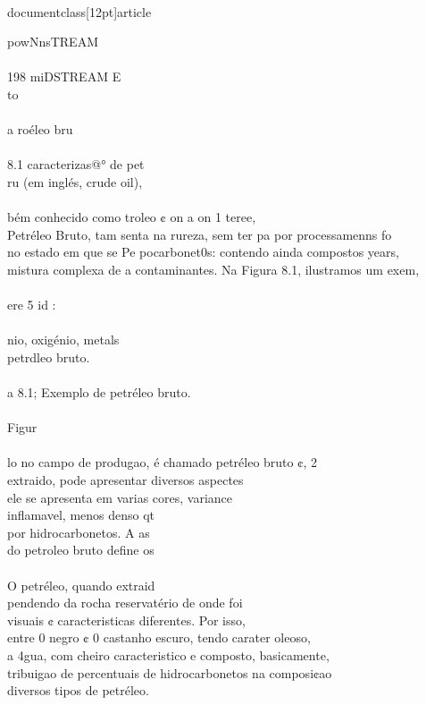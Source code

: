 \\documentclass[12pt]{article}
\begin{document}
powNnsTREAM\\
\\
198 miDSTREAM E\\
to\\
\\
a roéleo bru\\
\\
8.1 caracterizas@° de pet\\
ru (em inglés, crude oil),\\
\\
bém conhecido como troleo ¢ on a on 1 teree,\\
Petréleo Bruto, tam senta na rureza, sem ter pa por processamenns fo\\
no estado em que se Pe pocarbonet0s: contendo ainda compostos years,\\
mistura complexa de a contaminantes. Na Figura 8.1, ilustramos um exem,\\
\\
ere 5 id :\\
\\
nio, oxigénio, metals\\
petrdleo bruto.\\
\\
a 8.1; Exemplo de petréleo bruto.\\
\\
Figur\\
\\
lo no campo de produgao, é chamado petréleo bruto ¢, 2\\
extraido, pode apresentar diversos aspectes\\
ele se apresenta em varias cores, variance\\
inflamavel, menos denso qt\\
por hidrocarbonetos. A as\\
do petroleo bruto define os\\
\\
O petréleo, quando extraid\\
pendendo da rocha reservatério de onde foi\\
visuais ¢ caracteristicas diferentes. Por isso,\\
entre 0 negro ¢ 0 castanho escuro, tendo carater oleoso,\\
a 4gua, com cheiro caracteristico e composto, basicamente,\\
tribuigao de percentuais de hidrocarbonetos na composi¢ao\\
diversos tipos de petréleo.\\
\\
\end{document}
